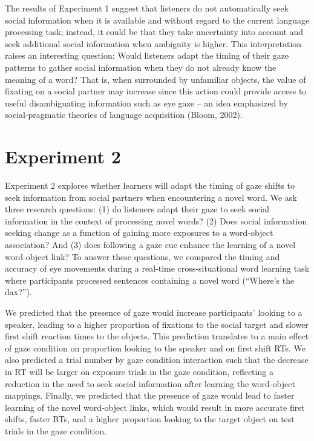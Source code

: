 \documentclass[10pt, letterpaper]{article}
\begin{document}
The results of Experiment 1 suggest that listeners do not automatically
seek social information when it is available and without regard to the
current language processing task; instead, it could be that they take
uncertainty into account and seek additional social information when
ambiguity is higher. This interpretation raises an interesting question:
Would listeners adapt the timing of their gaze patterns to gather social
information when they do not already know the meaning of a word? That
is, when surrounded by unfamiliar objects, the value of fixating on a
social partner may increase since this action could provide access to
useful disambiguating information such as eye gaze -- an idea emphasized
by social-pragmatic theories of language acquisition (Bloom, 2002).

\hypertarget{experiment-2}{%
\section{Experiment 2}\label{experiment-2}}

Experiment 2 explores whether learners will adapt the timing of gaze
shifts to seek information from social partners when encountering a
novel word. We ask three research questions: (1) do listeners adapt
their gaze to seek social information in the context of processing novel
words? (2) Does social information seeking change as a function of
gaining more exposures to a word-object association? And (3) does
following a gaze cue enhance the learning of a novel word-object link?
To answer these questions, we compared the timing and accuracy of eye
movements during a real-time cross-situational word learning task where
participants processed sentences containing a novel word (``Where's the
dax?'').

We predicted that the presence of gaze would increase participants'
looking to a speaker, leading to a higher proportion of fixations to the
social target and slower first shift reaction times to the objects. This
prediction translates to a main effect of gaze condition on proportion
looking to the speaker and on first shift RTs. We also predicted a trial
number by gaze condition interaction such that the decrease in RT will
be larger on exposure trials in the gaze condition, reflecting a
reduction in the need to seek social information after learning the
word-object mappings. Finally, we predicted that the presence of gaze
would lead to faster learning of the novel word-object links, which
would result in more accurate first shifts, faster RTs, and a higher
proportion looking to the target object on test trials in the gaze
condition.
\end{document}
